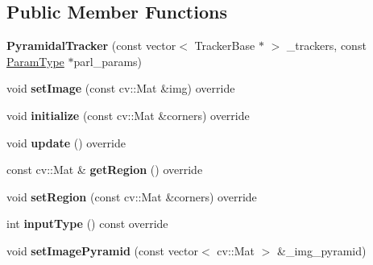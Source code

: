 \subsection*{Public Member Functions}
\begin{DoxyCompactItemize}
\item 
\hypertarget{classPyramidalTracker_a91b488684eff956899632e30b35fad67}{{\bfseries Pyramidal\-Tracker} (const vector$<$ Tracker\-Base $\ast$ $>$ \-\_\-trackers, const \hyperlink{structPyramidalParams}{Param\-Type} $\ast$parl\-\_\-params)}\label{classPyramidalTracker_a91b488684eff956899632e30b35fad67}

\item 
\hypertarget{classPyramidalTracker_a49e1ba285b8a726ca0b18ac88e59cd31}{void {\bfseries set\-Image} (const cv\-::\-Mat \&img) override}\label{classPyramidalTracker_a49e1ba285b8a726ca0b18ac88e59cd31}

\item 
\hypertarget{classPyramidalTracker_afda325083f4798561f6c6df6c7832259}{void {\bfseries initialize} (const cv\-::\-Mat \&corners) override}\label{classPyramidalTracker_afda325083f4798561f6c6df6c7832259}

\item 
\hypertarget{classPyramidalTracker_a23bb9bdc9296126ab11d8c89b2ddf50c}{void {\bfseries update} () override}\label{classPyramidalTracker_a23bb9bdc9296126ab11d8c89b2ddf50c}

\item 
\hypertarget{classPyramidalTracker_a26db8db3cc54456a4e9ce319692ce188}{const cv\-::\-Mat \& {\bfseries get\-Region} () override}\label{classPyramidalTracker_a26db8db3cc54456a4e9ce319692ce188}

\item 
\hypertarget{classPyramidalTracker_a575f2e582cf145571bb078bdb7b801d9}{void {\bfseries set\-Region} (const cv\-::\-Mat \&corners) override}\label{classPyramidalTracker_a575f2e582cf145571bb078bdb7b801d9}

\item 
\hypertarget{classPyramidalTracker_a7d306bad0d9e40973f109aacbee7a642}{int {\bfseries input\-Type} () const override}\label{classPyramidalTracker_a7d306bad0d9e40973f109aacbee7a642}

\item 
\hypertarget{classPyramidalTracker_afef203a6717f285b1640e133806cdb33}{void {\bfseries set\-Image\-Pyramid} (const vector$<$ cv\-::\-Mat $>$ \&\-\_\-img\-\_\-pyramid)}\label{classPyramidalTracker_afef203a6717f285b1640e133806cdb33}


\end{DoxyCompactItemize}
